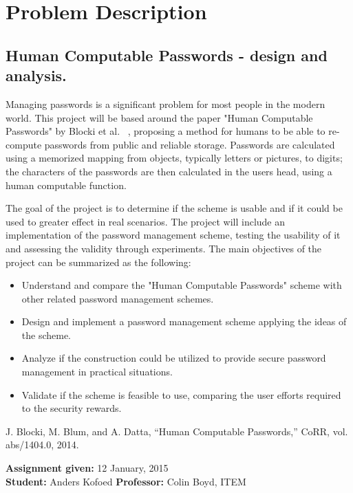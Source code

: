 \chapter*{Problem Description}
\section*{Human Computable Passwords - design and analysis.}
Managing passwords is a significant problem for most people in the modern world. This project will be based around the paper "Human Computable Passwords" by Blocki et al. ~\cite{hcp-blocki}, proposing a method for humans to be able to re-compute passwords from public and reliable storage. Passwords are calculated using a memorized mapping from objects, typically letters or pictures, to digits; the characters of the passwords are then calculated in the users head, using a human computable function.
\par The goal of the project is to determine if the scheme is usable and if it could be used to greater effect in real scenarios. The project will include an implementation of the password management scheme, testing the usability of it and assessing the validity through experiments. The main objectives of the project can be summarized as the following:

\begin{itemize}
    \item Understand and compare the "Human Computable Passwords" scheme with other related password management schemes.
    \item Design and implement a password management scheme applying the ideas of the scheme.
    \item Analyze if the construction could be utilized to provide secure password management in practical situations.
    \item Validate if the scheme is feasible to use, comparing the user efforts required to the security rewards.

\end{itemize}

\noindent
[1] J. Blocki, M. Blum, and A. Datta, “Human Computable Passwords,” CoRR, vol. abs/1404.0, 2014.

\noindent
\textbf{Assignment given: }12 January, 2015 \\
\textbf{Student: }Anders Kofoed \hfill \textbf{Professor: }Colin Boyd, ITEM \\

